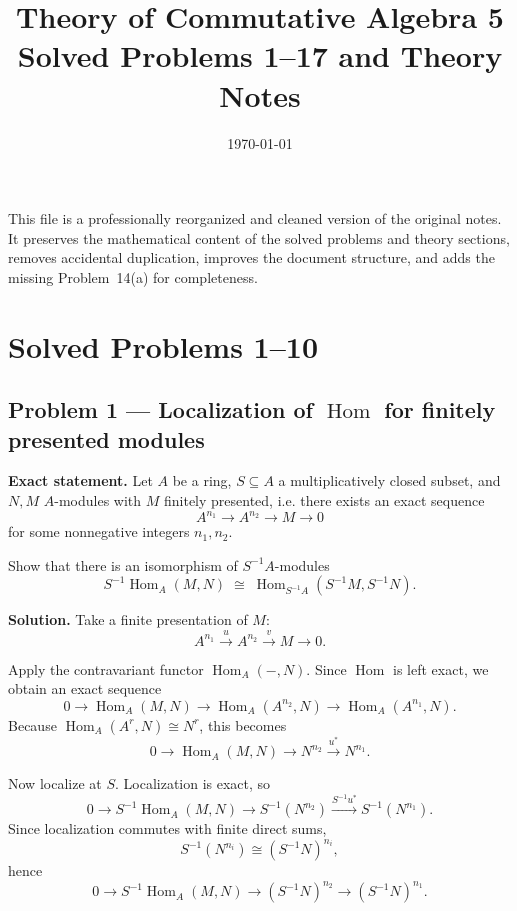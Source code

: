 \documentclass[12pt,a4paper,oneside]{report}
\title{\bfseries Theory of Commutative Algebra 5\\[0.5em]\Large Solved Problems 1--17 and Theory Notes}
\author{}
\date{\today}
\theoremstyle{notespace}
\begin{document}
\maketitle
\thispagestyle{plain}

\begin{center}
\begin{minipage}{0.92\textwidth}
This file is a professionally reorganized and cleaned version of the original notes. It preserves the mathematical content of the solved problems and theory sections, removes accidental duplication, improves the document structure, and adds the missing Problem~14(a) for completeness.
\end{minipage}
\end{center}

\tableofcontents
\clearpage
\chapter{Solved Problems 1--10}

\section{Problem 1 --- Localization of \texorpdfstring{$\operatorname{Hom}$}{Hom} for finitely presented modules}

\textbf{Exact statement.}
Let \(A\) be a ring, \(S \subseteq A\) a multiplicatively closed subset, and \(N,M\) \(A\)-modules with \(M\) finitely presented, i.e. there exists an exact sequence
\[
A^{n_1}\longrightarrow A^{n_2}\longrightarrow M\longrightarrow 0
\]
for some nonnegative integers \(n_1,n_2\).

Show that there is an isomorphism of \(S^{-1}A\)-modules
\[
S^{-1}\!\operatorname{Hom}_A(M,N)\;\cong\;\operatorname{Hom}_{S^{-1}A}(S^{-1}M,S^{-1}N).
\]

\textbf{Solution.}
Take a finite presentation of \(M\):
\[
A^{n_1}\xrightarrow{u} A^{n_2}\xrightarrow{v} M\to 0.
\]

Apply the contravariant functor \(\operatorname{Hom}_A(-,N)\). Since \(\operatorname{Hom}\) is left exact, we obtain an exact sequence
\[
0\to \operatorname{Hom}_A(M,N)\to \operatorname{Hom}_A(A^{n_2},N)\to \operatorname{Hom}_A(A^{n_1},N).
\]
Because \(\operatorname{Hom}_A(A^r,N)\cong N^r\), this becomes
\[
0\to \operatorname{Hom}_A(M,N)\to N^{n_2}\xrightarrow{u^*} N^{n_1}.
\]

Now localize at \(S\). Localization is exact, so
\[
0\to S^{-1}\operatorname{Hom}_A(M,N)\to S^{-1}(N^{n_2})\xrightarrow{S^{-1}u^*} S^{-1}(N^{n_1}).
\]
Since localization commutes with finite direct sums,
\[
S^{-1}(N^{n_i})\cong (S^{-1}N)^{n_i},
\]
hence
\[
0\to S^{-1}\operatorname{Hom}_A(M,N)\to (S^{-1}N)^{n_2}\to (S^{-1}N)^{n_1}.
\]
\end{document}
